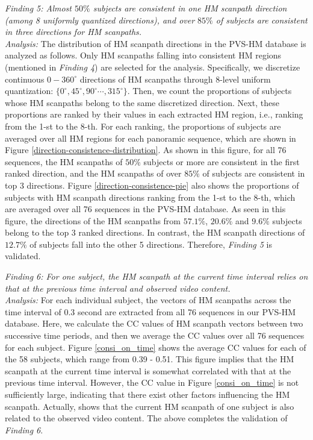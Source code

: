 \documentclass[10pt,journal,compsoc]{IEEEtran}
\begin{document}
\emph{Finding 5: Almost $50\%$ subjects are consistent in one HM scanpath direction (among 8 uniformly quantized directions), and over $85\%$ of subjects are consistent in three directions for HM scanpaths. }
\\ \textit{Analysis:} The distribution of HM scanpath directions in the PVS-HM database is analyzed as follows.
Only HM scanpaths falling into consistent HM regions (mentioned in \textit{Finding 4}) are selected for the analysis.
Specifically, we discretize continuous $0-360^{\circ}$ directions of HM scanpaths through 8-level uniform quantization: $\{0^{\circ}, 45^{\circ}, 90^{\circ} \cdots, 315^{\circ} \}$.
Then, we count the proportions of subjects whose HM scanpaths belong to the same discretized direction. Next, these proportions are ranked by their values in each extracted HM region, i.e., ranking from the 1-st to the 8-th. For each ranking, the proportions of subjects are averaged over all HM regions for each panoramic sequence, which are shown in Figure \ref{direction-consistence-distribution}.
As shown in this figure, for all 76 sequences, the HM scanpaths of $50\%$ subjects or more are consistent in the first ranked direction, and the HM scanpaths of over $85\%$ of subjects are consistent in top 3 directions. Figure \ref{direction-consistence-pie} also shows the proportions of subjects with HM scanpath directions ranking from the 1-st to the 8-th, which are averaged over all 76 sequences in the PVS-HM database.
As seen in this figure, the directions of the HM scanpaths from $57.1\%$, $20.6\%$ and $9.6\%$ subjects belong to the top 3 ranked directions. In contrast, the HM scanpath directions of $12.7\%$ of subjects fall into the other 5 directions. Therefore, \textit{Finding 5} is validated.





\emph{Finding 6: For one subject, the HM scanpath at the current time interval relies on that at the previous time interval and observed video content. }
\\ \textit{Analysis:} For each individual subject, the vectors of HM scanpaths across the time interval of 0.3 second are extracted from all 76 sequences in our PVS-HM database. Here, we calculate the CC values of HM scanpath vectors between two successive time periods, and then we average the CC values over all 76 sequences for each subject. Figure \ref{consi_on_time} shows the average CC values for each of the 58 subjects, which range from 0.39 - 0.51. This figure implies that the HM scanpath at the current time interval is somewhat correlated with that at the previous time interval. However, the CC value in Figure \ref{consi_on_time} is not sufficiently large, indicating that there exist other factors influencing the HM scanpath. Actually, \cite{hu2017deep} shows that the current HM scanpath of one subject is also related to the observed video content. The above completes the validation of \textit{Finding 6}.
\end{document}
